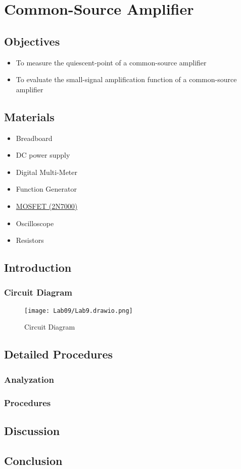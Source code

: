 \chapter{Common-Source Amplifier}


\section{Objectives}
\begin{itemize}
    \item To measure the quiescent-point of a common-source amplifier
    \item To evaluate the small-signal amplification function of a common-source amplifier
\end{itemize}

\section{Materials}
\begin{itemize}
    \item Breadboard
    \item DC power supply
    \item Digital Multi-Meter
    \item Function Generator
    \item \hyperref[2N7000_1]{MOSFET (2N7000)}
    \item Oscilloscope
    \item Resistors
\end{itemize}

\section{Introduction}
    \subsection{Circuit Diagram}
    \begin{figure}[h]
        \centering
        \texttt{[image: Lab09/Lab9.drawio.png]}
        \caption{Circuit Diagram}
        \label{l9f}
    \end{figure}
    \FloatBarrier

\section{Detailed Procedures}
    \subsection{Analyzation}


    \subsection{Procedures}

    
\section{Discussion}


\section{Conclusion}
